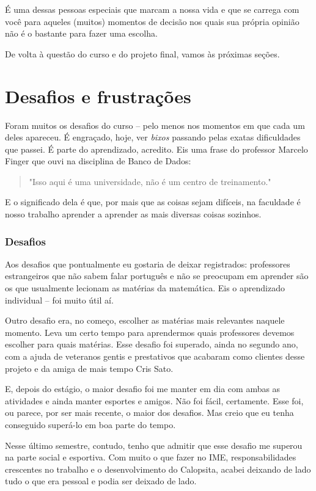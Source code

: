 \documentclass[titlepage,a4paper]{article}
\newcommand{\calopsita}{Calopsita}
\begin{document}
É uma dessas pessoas especiais que marcam a nossa vida e que se carrega com você para aqueles (muitos) momentos de decisão nos quais sua própria opinião não é o bastante para fazer uma escolha.

De volta à questão do curso e do projeto final, vamos às próximas seções.

\section{Desafios e frustrações}

Foram muitos os desafios do curso -- pelo menos nos momentos em que cada um deles apareceu. É engraçado, hoje, ver \textit{bixos} passando pelas exatas dificuldades que passei. É parte do aprendizado, acredito. Eis uma frase do professor Marcelo Finger que ouvi na disciplina de Banco de Dados:

\begin{quote}
	"Isso aqui é uma universidade, não é um centro de treinamento."
\end{quote}

E o significado dela é que, por mais que as coisas sejam difíceis, na faculdade é nosso trabalho aprender a aprender as mais diversas coisas sozinhos.

\subsubsection*{Desafios}

Aos desafios que pontualmente eu gostaria de deixar registrados: professores estrangeiros que não sabem falar português e não se preocupam em aprender são os que usualmente lecionam as matérias da matemática. Eis o aprendizado individual -- foi muito útil aí.

Outro desafio era, no começo, escolher as matérias mais relevantes naquele momento. Leva um certo tempo para aprendermos quais professores devemos escolher para quais matérias. Esse desafio foi superado, ainda no segundo ano, com a ajuda de veteranos gentis e prestativos que acabaram como clientes desse projeto e da amiga de mais tempo Cris Sato.

E, depois do estágio, o maior desafio foi me manter em dia com ambas as atividades e ainda manter esportes e amigos. Não foi fácil, certamente. Esse foi, ou parece, por ser mais recente, o maior dos desafios. Mas creio que eu tenha conseguido superá-lo em boa parte do tempo.

Nesse último semestre, contudo, tenho que admitir que esse desafio me superou na parte social e esportiva. Com muito o que fazer no IME, responsabilidades crescentes no trabalho e o desenvolvimento do \calopsita{}, acabei deixando de lado tudo o que era pessoal e podia ser deixado de lado.
\end{document}
